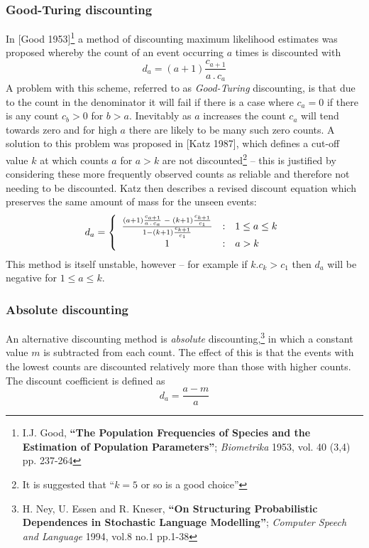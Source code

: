 \subsubsection{Good-Turing discounting}
In [Good 1953]\footnote{I.J. Good, \textbf{``The Population Frequencies
of Species and the Estimation of Population Parameters''};
\textit{Biometrika} 1953, vol. 40 (3,4) pp. 237-264}
a method of discounting maximum likelihood estimates was proposed
whereby the count of an event occurring $a$ times is discounted with
\begin{equation}
d_a = (a+1) \frac{c_{a+1}}{a\,.\,c_a}
\end{equation}
A problem with this scheme, referred to as {\it Good-Turing} discounting,
is that due to the count in the denominator it will fail if there is a
case where $c_a = 0$ if there is any count $c_b > 0$ for
$b>a$. Inevitably as $a$ increases the count $c_a$ will tend towards
zero and for high $a$ there are likely to be many such zero counts. A
solution to this problem was proposed in
[Katz 1987], which defines a cut-off value $k$ at which counts $a$
for $a > k$ are not discounted\footnote{It is suggested that ``$k=5$
or so is a good choice''} -- this is justified by
considering these more frequently observed counts as reliable and
therefore not needing to be discounted. Katz then describes a revised
discount equation which preserves the same amount of mass for the
unseen events:
\begin{equation}
d_a = \left\{ \begin{array}{c@{\quad:\quad}l}
  \frac{(a+1) \frac{c_{a+1}}{a\,.\,c_a} \;-\; (k+1)\frac{c_{k+1}}{c_1}}
      {1 - (k+1)\frac{c_{k+1}}{c_1}}
  & 1 \le a \le k\\
1 & a>k
\end{array}\right.
\end{equation}
This method is itself unstable, however -- for example if $k.c_k > c_1$
then $d_a$ will be negative for $1 \le a \le k$.

\subsubsection{Absolute discounting}
An alternative discounting method is {\it absolute}
discounting,\footnote{H. Ney, U. Essen and R. Kneser, \textbf{``On
Structuring Probabilistic Dependences in Stochastic Language
Modelling''}; \textit{Computer Speech and Language} 1994, vol.8 no.1
pp.1-38} in which a constant value $m$ is subtracted from each
count. The effect of this is that the events with the lowest counts
are discounted relatively more than those with higher counts. The
discount coefficient is defined as
\begin{equation}
d_a = \frac{a-m}{a}
\end{equation}

